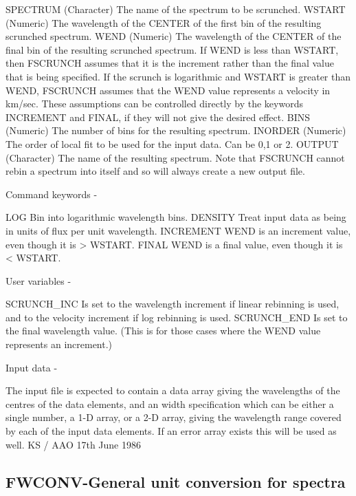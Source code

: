 \begin{description}
\begin{description}
\begin{terminalv}
 SPECTRUM     (Character) The name of the spectrum to be scrunched.
 WSTART       (Numeric) The wavelength of the CENTER of the first
              bin of the resulting scrunched spectrum.
 WEND         (Numeric) The wavelength of the CENTER of the final
              bin of the resulting scrunched spectrum.  If WEND is
              less than WSTART, then FSCRUNCH assumes that it is the
              increment rather than the final value that is being
              specified.  If the scrunch is logarithmic and WSTART
              is greater than WEND, FSCRUNCH assumes that the WEND
              value represents a velocity in km/sec.  These
              assumptions can be controlled directly by the keywords
              INCREMENT and FINAL, if they will not give the desired
              effect.
 BINS         (Numeric) The number of bins for the resulting spectrum.
 INORDER      (Numeric) The order of local fit to be used for the
              input data.   Can be 0,1 or 2.
 OUTPUT       (Character) The name of the resulting spectrum.
              Note that FSCRUNCH cannot rebin a spectrum into itself
              and so will always create a new output file.

 Command keywords -

 LOG          Bin into logarithmic wavelength bins.
 DENSITY      Treat input data as being in units of flux per unit
              wavelength.
 INCREMENT    WEND is an increment value, even though it is > WSTART.
 FINAL        WEND is a final value, even though it is < WSTART.

 User variables -

 SCRUNCH_INC  Is set to the wavelength increment if linear
              rebinning is used, and to the velocity increment if
              log rebinning is used.
 SCRUNCH_END  Is set to the final wavelength value.  (This is for
              those cases where the WEND value represents an
              increment.)

 Input data -

 The input file is expected to contain a data array giving
 the wavelengths of the centres of the data elements, and an
 width specification which can be either a single number,
 a 1-D array, or a 2-D array, giving the wavelength range covered
 by each of the input data elements.  If an error array exists
 this will be used as well.
                                          KS / AAO 17th June 1986
\end{terminalv}
\end{description}
\subsection{FWCONV-\label{FWCONV}General unit conversion for spectra}
\begin{description}


\end{description}
\end{description}
